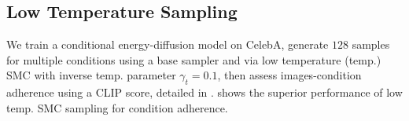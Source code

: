 \subsection{Low Temperature Sampling}\label{exp:low_temp}
We train a conditional energy-diffusion model on CelebA, generate $128$ samples for multiple conditions using a base sampler and via low temperature (temp.) SMC with inverse temp. parameter $\gamma_t=0.1$, then assess images-condition adherence using a CLIP score, detailed in .  shows the superior performance of low temp. SMC sampling for condition adherence.


